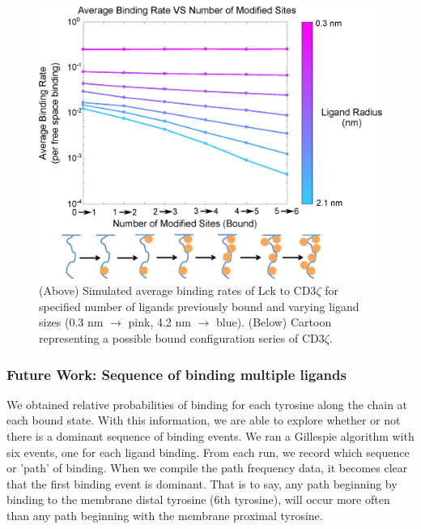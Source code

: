 \documentclass[../../AdvancementSummary.tex]{subfiles}
\begin{document}
\begin{figure}[H]
	\begin{center}
		\includegraphics[width=\linewidth]{ResultsFigures/CD3ZetaMultipleBindingMembraneOn/ibEqual/AvgBindVSTotalModified.eps}
		\caption{(Above) Simulated average binding rates of Lck to CD3$\zeta$ for specified number of ligands previously bound and varying ligand sizes (0.3 nm $\rightarrow$ pink, 4.2 nm $		\rightarrow$ blue). (Below) Cartoon representing a possible bound configuration series of CD3$\zeta$. \label{fig: SimBindMemOnibEqual} }
	\end{center}
\end{figure}


\subsubsection{Future Work: Sequence of binding multiple ligands}

We obtained relative probabilities of binding for each tyrosine along the chain at each bound state. With this information, we are able to explore whether or not there is a dominant sequence of binding events. We ran a Gillespie algorithm with six events, one for each ligand binding. From each run, we record which sequence or 'path' of binding. When we compile the path frequency data, it becomes clear that the first binding event is dominant. That is to say, any path beginning by binding to the membrane distal tyrosine (6th tyrosine), will occur more often than any path beginning with the membrane proximal tyrosine. 
\end{document}
